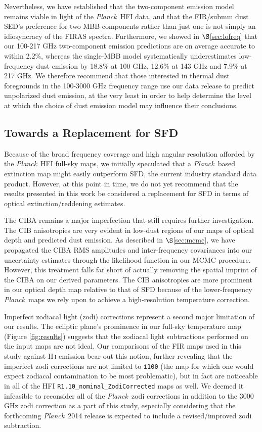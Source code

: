 \documentclass{emulateapj}
\newcommand{\PLANCK}{{\it Planck}}
\begin{document}
Nevertheless, we have established that the two-component emission model remains
viable in light of the \PLANCK~HFI data, and that the FIR/submm dust SED's 
preference for two MBB components rather than just one is not simply an 
idiosyncracy of the FIRAS spectra. Furthermore, we showed in 
$\S$\ref{sec:lofreq} that our 100-217 GHz two-component emission predictions 
are on average accurate to within 2.2\%, whereas the \cite{planckdust} 
single-MBB model systematically underestimates low-frequency dust emission by 
18.8\% at 100 GHz, 12.6\% at 143 GHz and 7.9\% at 217 GHz. We therefore 
recommend that those interested in thermal dust foregrounds in the 100-3000 GHz
frequency range use our data release to predict unpolarized dust emission, at 
the very least in order to help determine the level at which the choice of dust
emission model may influence their conclusions.

\subsection{Towards a Replacement for SFD}
\label{sec:replace}
Because of the broad frequency coverage and high angular resolution afforded
by the \PLANCK~HFI full-sky maps, we initially speculated that a \PLANCK~based 
extinction map might easily outperform SFD, the current industry standard data 
product. However, at this point in time, we do not yet recommend that the 
results presented in this work be considered a replacement for SFD in terms of 
optical extinction/reddening estimates.

The CIBA remains a major imperfection that still requires further 
investigation. The CIB anisotropies are very evident in low-dust regions of our
maps of optical depth and predicted dust emission. As described in 
$\S$\ref{sec:mcmc}, we have propagated the CIBA RMS amplitudes and 
inter-frequency covariances into our uncertainty estimates through the 
likelihood function in our MCMC procedure. However, this treatment falls far 
short of actually removing the spatial imprint of the CIBA on our derived 
parameters. The CIB anisotropies are more prominent in our optical depth map 
relative to that of SFD because of the lower-frequency \PLANCK~maps we rely 
upon to achieve a high-resolution temperature correction.

Imperfect zodiacal light (zodi) corrections represent a second major limitation
of our results. The ecliptic plane's prominence in our full-sky temperature map
(Figure \ref{fig:results}) suggests that the zodiacal light subtractions 
performed on the input maps are not ideal. Our comparisons of the FIR maps used
in this study against H\,\textsc{i} emission bear out this notion, further 
revealing that the imperfect zodi corrections are not limited to \verb|i100| 
(the map for which one would expect zodiacal contamination to be most 
problematic), but in fact are noticeable in all of the HFI 
\verb|R1.10_nominal_ZodiCorrected| maps as well. We deemed it infeasible to 
reconsider all of the \PLANCK~zodi corrections in addition to the 3000 GHz zodi
correction as a part of this study, especially considering that the forthcoming
\PLANCK~2014 release is expected to include a revised/improved zodi 
subtraction.
\end{document}
